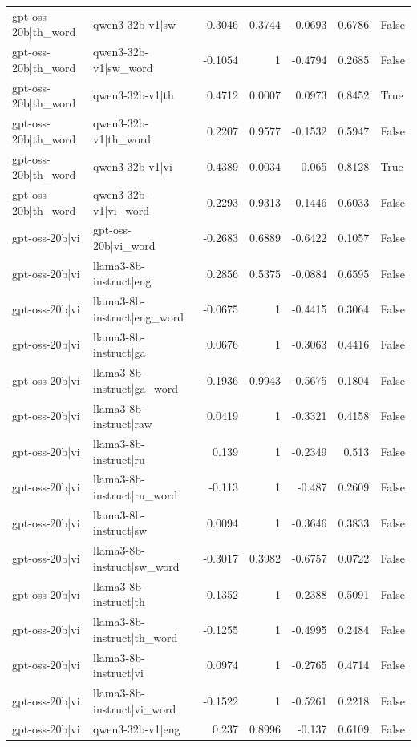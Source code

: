 \begin{table}
\begin{tabular}{l l r r r r l}
gpt-oss-20b|th_word & qwen3-32b-v1|sw & 0.3046 & 0.3744 & -0.0693 & 0.6786 & False \\
gpt-oss-20b|th_word & qwen3-32b-v1|sw_word & -0.1054 & 1 & -0.4794 & 0.2685 & False \\
gpt-oss-20b|th_word & qwen3-32b-v1|th & 0.4712 & 0.0007 & 0.0973 & 0.8452 & True \\
gpt-oss-20b|th_word & qwen3-32b-v1|th_word & 0.2207 & 0.9577 & -0.1532 & 0.5947 & False \\
gpt-oss-20b|th_word & qwen3-32b-v1|vi & 0.4389 & 0.0034 & 0.065 & 0.8128 & True \\
gpt-oss-20b|th_word & qwen3-32b-v1|vi_word & 0.2293 & 0.9313 & -0.1446 & 0.6033 & False \\
gpt-oss-20b|vi & gpt-oss-20b|vi_word & -0.2683 & 0.6889 & -0.6422 & 0.1057 & False \\
gpt-oss-20b|vi & llama3-8b-instruct|eng & 0.2856 & 0.5375 & -0.0884 & 0.6595 & False \\
gpt-oss-20b|vi & llama3-8b-instruct|eng_word & -0.0675 & 1 & -0.4415 & 0.3064 & False \\
gpt-oss-20b|vi & llama3-8b-instruct|ga & 0.0676 & 1 & -0.3063 & 0.4416 & False \\
gpt-oss-20b|vi & llama3-8b-instruct|ga_word & -0.1936 & 0.9943 & -0.5675 & 0.1804 & False \\
gpt-oss-20b|vi & llama3-8b-instruct|raw & 0.0419 & 1 & -0.3321 & 0.4158 & False \\
gpt-oss-20b|vi & llama3-8b-instruct|ru & 0.139 & 1 & -0.2349 & 0.513 & False \\
gpt-oss-20b|vi & llama3-8b-instruct|ru_word & -0.113 & 1 & -0.487 & 0.2609 & False \\
gpt-oss-20b|vi & llama3-8b-instruct|sw & 0.0094 & 1 & -0.3646 & 0.3833 & False \\
gpt-oss-20b|vi & llama3-8b-instruct|sw_word & -0.3017 & 0.3982 & -0.6757 & 0.0722 & False \\
gpt-oss-20b|vi & llama3-8b-instruct|th & 0.1352 & 1 & -0.2388 & 0.5091 & False \\
gpt-oss-20b|vi & llama3-8b-instruct|th_word & -0.1255 & 1 & -0.4995 & 0.2484 & False \\
gpt-oss-20b|vi & llama3-8b-instruct|vi & 0.0974 & 1 & -0.2765 & 0.4714 & False \\
gpt-oss-20b|vi & llama3-8b-instruct|vi_word & -0.1522 & 1 & -0.5261 & 0.2218 & False \\
gpt-oss-20b|vi & qwen3-32b-v1|eng & 0.237 & 0.8996 & -0.137 & 0.6109 & False \\

\end{tabular}
\end{table}
